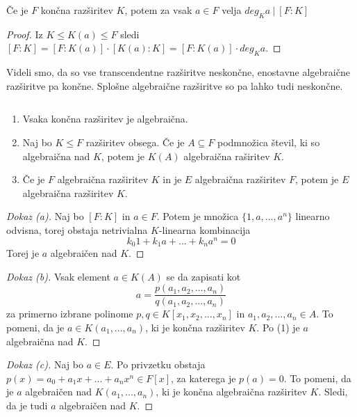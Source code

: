\documentclass[11pt, a4paper]{article}
\begin{document}
    \begin{corollary}
        Če je \(F\) končna razširitev \(K\), potem za vsak \(a \in F\) velja \(deg_{K} a\ |\ [F:K]\)
    \end{corollary}

    \begin{proof}
        Iz \(K \le K(a) \le F\) sledi \([F:K] = [F:K(a)] \cdot [K(a):K] = [F:K(a)] \cdot deg_{K} a\).
    \end{proof}


    Videli smo, da so vse transcendentne razširitve neskončne, enostavne algebraične razširitve pa končne. Splošne algebraične razširitve so pa lahko tudi neskončne.

    \begin{theorem}
        \(\)\par
        \begin{enumerate}[label=\alph*)]
            \item Vsaka končna razširitev je algebraična.
            \item Naj bo \(K \le F\) razširitev obsega. Če je \(A \subseteq F\) podmnožica števil, ki so algebraična nad \(K\), potem je \(K(A)\) algebraična raširitev \(K\).
            \item Če je \(F\) algebraična razširitev \(K\) in je \(E\) algebraična razširitev \(F\), potem je \(E\) algebraična razširitev \(K\).
        \end{enumerate}
    \end{theorem}

    \begin{proof}[Dokaz \emph{(a)}]
        Naj bo \([F:K]\) in \(a \in F\). Potem je množica \(\{1,a,...,a^{n}\}\) linearno odvisna, torej obstaja netrivialna \(K\)-linearna kombinacija 
        \[k_0 1 + k_1 a + ... + k_n a^{n} = 0\]
        Torej je \(a\) algebraičen nad \(K\).
    \end{proof}

    \begin{proof}[Dokaz \emph{(b)}]
        Vsak element \(a \in K(A)\) se da zapisati kot 
        \[a = \frac{p(a_1,a_2,...,a_n)}{q(a_1,a_2,...,a_n)}\]
        za primerno izbrane polinome \(p,q \in K[x_1,x_2,...,x_n]\) in \(a_1,a_2,...,a_n \in A\). To pomeni, da je \(a \in K(a_1,...,a_n)\), ki je končna razširitev \(K\). Po (1) je \(a\) algebraična nad \(K\).
    \end{proof}

    \begin{proof}[Dokaz \emph{(c)}]
        Naj bo \(a \in E\). Po privzetku obstaja \(p(x)=a_0 + a_1 x + ... + a_n x^n \in F[x]\), za katerega je \(p(a) = 0\). To pomeni, da je \(a\) algebraičen nad \(K(a_1,...,a_n)\), ki je končna algebraična razširitev \(K\). Sledi, da je tudi \(a\) algebraičen nad \(K\).
    \end{proof}
\end{document}
